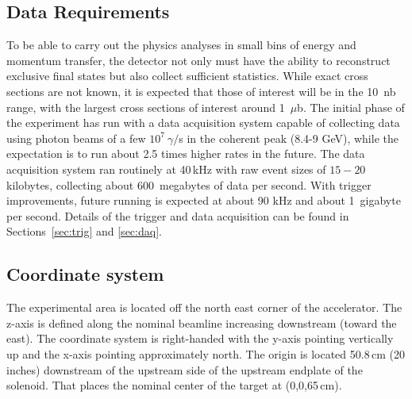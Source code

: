 \subsection{Data Requirements \label{sec:intro:data_requirements}}
To be able to carry out the physics analyses in small bins of energy and momentum transfer, the detector not only must have the ability to reconstruct exclusive final states but also collect sufficient statistics. While exact cross sections are not known, it is expected that those of interest will be in the 10~nb range, with the largest cross sections of interest around 1~$\mu$b. The initial phase of the \GX{} experiment has run with a data acquisition system capable of collecting data using photon beams of a few $10^{7}~\gamma/$s in the coherent peak (8.4-9 GeV), while the expectation is to run about 2.5 times higher rates in the future. %
The data acquisition system ran routinely at 40\,kHz with raw event sizes of $15-20$ kilobytes, collecting about 600~megabytes of data per second. With trigger improvements, future running is expected at about 90 kHz and about 1~gigabyte per second. Details of the trigger and data acquisition can be found in Sections~\ref{sec:trig} and \ref{sec:daq}.

\subsection{Coordinate system \label{sec:intro:coordinates}}
The experimental area is located 
off the north east corner of the accelerator. The z-axis is defined along the nominal beamline increasing downstream (toward the east). The coordinate system 
is right-handed with the y-axis pointing vertically up and the x-axis pointing approximately north. 
The origin is located 50.8\,cm (20 inches) downstream of the upstream side of the upstream endplate of the solenoid. That places the nominal center of the target at (0,0,65\,cm).
